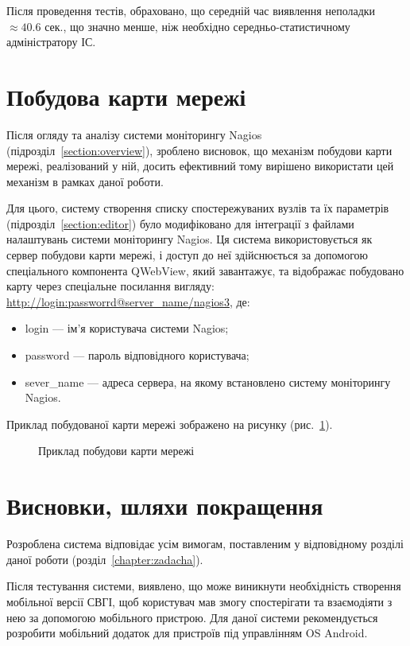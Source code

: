 \documentclass{thesis_utf8}
\begin{document}
Після проведення тестів, обраховано, що середній час виявлення неполадки $\approx 40.6 $ сек., що значно менше, ніж необхідно середньо-статистичному адміністратору ІС.

\section{Побудова карти мережі}

Після огляду та аналізу системи моніторингу Nagios (підрозділ~\ref{section:overview}), зроблено висновок, що механізм побудови карти мережі, реалізований у ній, досить ефективний тому вирішено використати цей механізм в рамках даної роботи.

Для цього, систему створення списку спостережуваних вузлів та їх параметрів (підрозділ~\ref{section:editor}) було модифіковано для інтеграції з файлами налаштувань системи моніторингу Nagios. Ця система використовується як сервер побудови карти мережі, і доступ до неї здійснюється за допомогою спеціального компонента QWebView, який завантажує, та відображає побудовано карту через спеціальне посилання вигляду: \url{http://login:passworrd@server_name/nagios3}, де:
\begin{itemize}
    \item login --- ім'я користувача системи Nagios;
    \item password --- пароль відповідного користувача;
    \item sever\_name --- адреса сервера, на якому встановлено систему моніторингу Nagios.
\end{itemize}

Приклад побудованої карти мережі зображено на рисунку (рис.~\ref{fig:map}).


\begin{figure}[!h]
    \centering
    \caption{Приклад побудови карти мережі}
    \label{fig:map}
\end{figure}

\section{Висновки, шляхи покращення}

Розроблена система відповідає усім вимогам, поставленим у відповідному розділі даної роботи (розділ~\ref{chapter:zadacha}).

Після тестування системи, виявлено, що може виникнути необхідність створення мобільної версії СВГІ, щоб користувач мав змогу спостерігати та взаємодіяти з нею за допомогою мобільного пристрою. Для даної системи рекомендується розробити мобільний додаток для пристроїв під управлінням OS Android.
\end{document}
